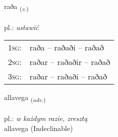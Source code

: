\documentclass[frontgrid, backgrid]{flacards}\usepackage[]{graphicx}\usepackage[]{xcolor}
\begin{document}
\renewcommand{\blhead}{\vskip5pt {\small\bfseries\footnotesize Sagnorð | Verb }}
\renewcommand{\bcfoot}{\vskip5pt \hspace{2pt}{\small\bfseries\footnotesize 2K}}


{raða \small{\textsubscript{(\textit{v.})}} \\[1ex] %
\textphonetic{[raːða]} \\
pl.: \emph{ustawić} \\  [2ex]
\renewcommand*{\arraystretch}{0.8}
\begin{tabular}{p{1cm}l}
\textsc{1sg}: & raða -- raðaði -- raðað \\ 
\textsc{2sg}: & raðar -- raðaðir -- raðað \\ 
\textsc{3sg}: & raðar -- raðaði -- raðað \\ 
\end{tabular}
}


\renewcommand{\flhead}{\vskip5pt \fboxsep=0pt {\small\bfseries\footnotesize Atviksorð | Adverb}}
\renewcommand{\fcfoot}{\vskip5pt \fboxsep=0pt \hspace{2pt}{\small\bfseries\footnotesize 2K}}

\renewcommand{\blhead}{\vskip5pt {\small\bfseries\footnotesize Atviksorð | Adverb }}
\renewcommand{\bcfoot}{\vskip5pt \hspace{2pt}{\small\bfseries\footnotesize 2K}}


{allavega \small{\textsubscript{(\textit{adv.})}} \\[1ex]
\textphonetic{[atlavɛɣa]} \\
pl.: \emph{w każdym razie, zresztą} \\  [2ex]
allavega (Indeclinable)}

\renewcommand{\flhead}{\vskip5pt \fboxsep=0pt {\small\bfseries\footnotesize Nafnorð | Noun}}
\renewcommand{\fcfoot}{\vskip5pt \fboxsep=0pt \hspace{2pt}{\small\bfseries\footnotesize 2K}}

\renewcommand{\blhead}{\vskip5pt {\small\bfseries\footnotesize Nafnorð | Noun }}
\renewcommand{\bcfoot}{\vskip5pt \hspace{2pt}{\small\bfseries\footnotesize 2K}}
\end{document}
